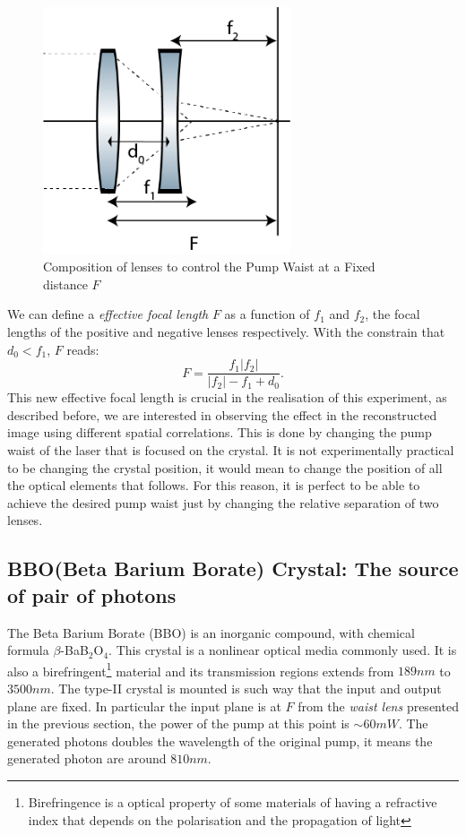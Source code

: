\begin{figure}[h!]
\centering
 \includegraphics[width=0.65\textwidth]{Figures/fixed.png}
\caption{Composition of lenses to control the Pump Waist at a Fixed distance $F$} 
\label{fig:fixed}
\end{figure}
We can define a \textit{effective focal length} $F$ as a function of  $f_1$ and $f_2$, the focal lengths of the positive and negative lenses 
respectively. With the constrain that $d_0 < f_1$, $F$ reads:
\begin{equation}
F=\frac{f_1 |f_2|}{|f_2|-f_1+d_0}.
\end{equation}
This new effective focal length is crucial in the realisation of this experiment, as described before, we are interested in observing the effect 
in the reconstructed image using different spatial correlations. This is done by changing the pump waist of the laser that is focused on the crystal.
It is not experimentally practical to be changing the crystal position, it would mean to change the position of all the optical elements that 
follows. For this reason, it is perfect to be able to achieve the desired pump waist just by changing the relative separation of two lenses. 


\subsection{BBO(Beta Barium Borate) Crystal: The source of pair of photons}
The Beta Barium Borate (BBO) is an inorganic compound, with chemical formula $\beta$-BaB$_{2}$O$_4$. This crystal is a
nonlinear optical media commonly used. It is also a birefringent\footnote{Birefringence is a optical property of some materials of 
having a refractive index that depends on the polarisation and the propagation of light\cite{hecht}} material and its transmission regions extends
from $189nm$ to $3500nm$\cite{bbo}.
The type-II crystal is mounted is such way that the input and output plane are fixed. In particular the input plane is at $F$ from 
the \textit{waist lens} presented in the previous section, the power of the pump at this point is $\sim 60mW$. The generated photons doubles the wavelength 
of the original pump, it means the generated photon are around $810nm$.


